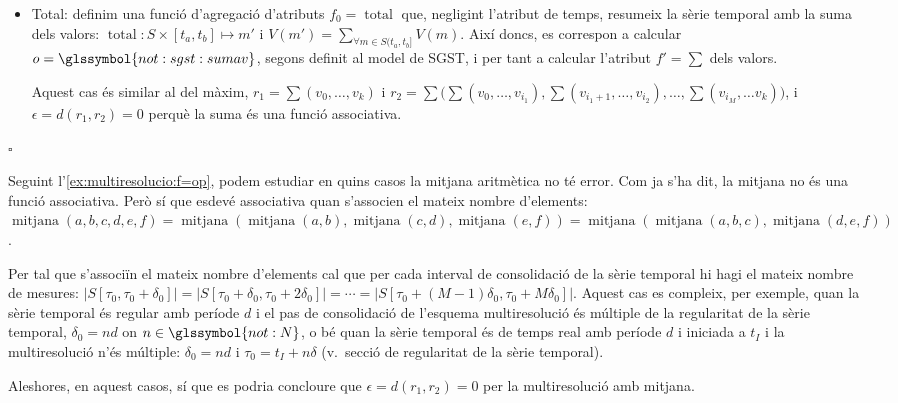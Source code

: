 \begin{example}
\begin{itemize}
  \item Total: definim una funció d'agregació d'atributs
    $f_0=\operatorname{total}$ que, negligint l'atribut de temps,
    resumeix la sèrie temporal amb la suma dels valors:
    $\operatorname{total}: S \times [t_a,t_b] \mapsto m'$ i $V(m') =
    \sum\limits_{\forall m\in S(t_a,t_b]} V(m)$. Així doncs, es
    correspon a calcular $o=\glssymbol{not:sgst:sumav}$, segons
    definit al model de \gls{SGST}, i per tant a calcular l'atribut
    $f'=\sum$ dels valors.

    Aquest cas és similar al del màxim, $r_1=\sum(v_0,\dotsc, v_k)$ i
    $r_2=\sum\big( \sum(v_0,\dotsc,v_{i_1}),
    \sum(v_{i_1+1},\dotsc,v_{i_2}), \dotsc, \sum(v_{i_M}, \dotsc v_k)
    \big)$, i $\epsilon=d(r_1,r_2)=0$ perquè la suma és una funció
    associativa.
    



  \end{itemize}

$\square$
\end{example}






\begin{example}
  Seguint l'\autoref{ex:multiresolucio:f=op}, podem estudiar en quins
  casos la mitjana aritmètica no té error. Com ja s'ha dit, la mitjana
  no és una funció associativa. Però sí que esdevé associativa quan
  s'associen el mateix nombre d'elements:
  $\operatorname{mitjana}(a,b,c,d,e,f) = \operatorname{mitjana}(
  \operatorname{mitjana}(a,b), \operatorname{mitjana}(c,d),
  \operatorname{mitjana}(e,f)) = \operatorname{mitjana}(
  \operatorname{mitjana}(a,b,c), \operatorname{mitjana}(d,e,f))$.

  Per tal que s'associïn el mateix nombre d'elements cal que per cada
  interval de consolidació de la sèrie temporal hi hagi el mateix
  nombre de mesures:
  $|S[\tau_0,\tau_0+\delta_0]|=|S[\tau_0+\delta_0,\tau_0+2\delta_0]|=\dotsb
  = |S[\tau_0+(M-1)\delta_0,\tau_0+M\delta_0]|$.  Aquest cas es
  compleix, per exemple, quan la sèrie temporal és regular amb període
  $d$ i el pas de consolidació de l'esquema multiresolució és múltiple
  de la regularitat de la sèrie temporal, $\delta_0 = nd$ on
  $n\in\glssymbol{not:N}$, o bé quan la sèrie temporal és de temps
  real amb període $d$ i iniciada a $t_I$ i la multiresolució n'és
  múltiple: $\delta_0 = nd$ i $\tau_0 = t_I+n\delta$ (v.\ secció de
  regularitat de la sèrie temporal).

  Aleshores, en aquest casos, sí que es podria concloure que
  $\epsilon=d(r_1,r_2)=0$ per la multiresolució amb mitjana.
\end{example}






